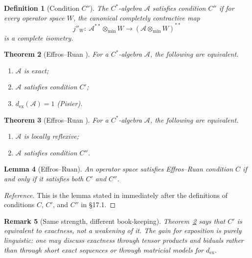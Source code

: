 \documentclass[12pt]{article}
\newtheorem{theorem}{Theorem}[section]
\newtheorem{lemma}[theorem]{Lemma}
\newtheorem{definition}[theorem]{Definition}
\newtheorem{remark}[theorem]{Remark}
\newcommand{\A}{\mathcal A}
\newcommand{\otmin}{\otimes_{\min}}
\newcommand{\dex}{d_{\mathrm{ex}}}
\begin{document}
\begin{definition}[Condition $C''$]\label{def:cpp}
The $C^*$-algebra $\A$ satisfies \emph{condition $C''$} if for every operator space $W$, the canonical completely contractive map
\[
        j''_W:\ \A^{**}\otmin W\longrightarrow (\A\otmin W)^{**}
\]
is a complete isometry.
\end{definition}

\begin{theorem}[Effros--Ruan {\cite[Thm.~PEX.1]{ER}}]\label{thm:pex}
For a $C^*$-algebra $\A$, the following are equivalent.
\begin{enumerate}[label=(\roman*),leftmargin=2.4em]
\item $\A$ is exact;
\item $\A$ satisfies condition $C'$;
\item $\dex(\A)=1$ \textup{(Pisier).}
\end{enumerate}
\end{theorem}

\begin{theorem}[Effros--Ruan {\cite[Thm.~PLR1.1]{ER}}]\label{thm:plr}
For a $C^*$-algebra $\A$, the following are equivalent.
\begin{enumerate}[label=(\roman*),leftmargin=2.4em]
\item $\A$ is locally reflexive;
\item $\A$ satisfies condition $C''$.
\end{enumerate}
\end{theorem}

\begin{lemma}[Effros--Ruan]\label{lem:ccc}
An operator space satisfies Effros--Ruan condition $C$ if and only if it satisfies both $C'$ and $C''$.
\end{lemma}

\begin{proof}[Reference]
This is the lemma stated in \cite{ER} immediately after the definitions of conditions $C$, $C'$, and $C''$ in \S17.1.
\end{proof}

\begin{remark}[Same strength, different book-keeping]
Theorem~\ref{thm:pex} says that $C'$ is \emph{equivalent} to exactness, not a weakening of it.  The gain for exposition is purely linguistic: one may discuss exactness through tensor products and biduals rather than through short exact sequences or through matricial models for $\dex$.
\end{remark}
\end{document}
